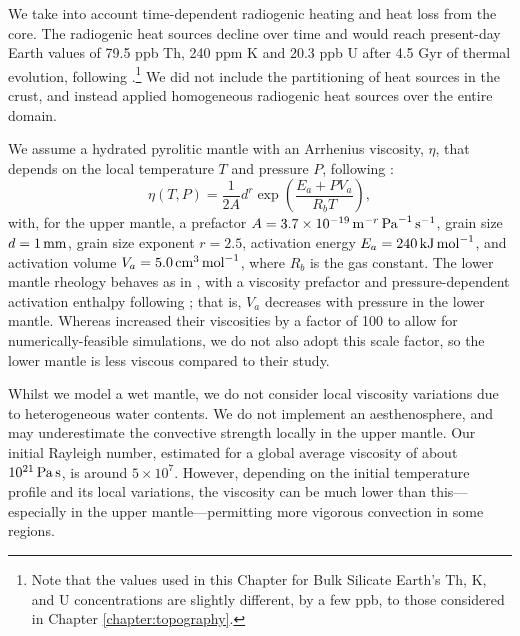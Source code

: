 We take into account time-dependent radiogenic heating and heat loss from the core. The radiogenic heat sources decline over time and would reach present-day Earth values of 79.5 ppb Th, 240 ppm K and 20.3 ppb U after 4.5 Gyr of thermal evolution, following \citet{schubert_turcotte_olson_2001}.\footnote{Note that the values used in this Chapter for Bulk Silicate Earth's Th, K, and U concentrations are slightly different, by a few ppb, to those considered in Chapter \ref{chapter:topography}.} We did not include the partitioning of heat sources in the crust, and instead applied homogeneous radiogenic heat sources over the entire domain.

We assume a hydrated pyrolitic mantle with an Arrhenius viscosity, $\eta$, that depends on the local temperature $T$ and pressure $P$, following \citet{karato_rheology_1993}:
\begin{equation}
    \eta(T,P) = \frac{1}{2 A} d^r \exp\left(\frac{E_a+PV_a}{R_bT}\right),
\end{equation}
with, for the upper mantle, a prefactor $A=3.7 \times 10^{-19}\,{\rm m}^{-r}\,{\rm Pa}^{-1}\,{\rm s}^{-1}$, grain size $d=1\,{\rm mm}$, grain size exponent $r=2.5$, activation energy $E_a=240\,{\rm kJ}\,{\rm mol}^{-1}$, and activation volume $V_a=5.0\,{\rm cm}^{3}\,{\rm mol}^{-1}$, where $R_b$ is the gas constant. The lower mantle rheology behaves as in \citet{noack_volcanism_2017}, with a viscosity prefactor and pressure-dependent activation enthalpy following \citet{tackley_mantle_2013}; that is, $V_a$ decreases with pressure in the lower mantle. Whereas \citet{tackley_mantle_2013} increased their viscosities by a factor of 100 to allow for numerically-feasible simulations, we do not also adopt this scale factor, so the lower mantle is less viscous compared to their study.

Whilst we model a wet mantle, we do not consider local viscosity variations due to heterogeneous water contents. We do not implement an aesthenosphere, and may underestimate the convective strength locally in the upper mantle. Our initial Rayleigh number, estimated for a global average viscosity of about $10^{21}\,{\rm Pa\,s}$, is around $5\times10^7$. However, depending on the initial temperature profile and its local variations, the viscosity can be much lower than this---especially in the upper mantle---permitting more vigorous convection in some regions.



